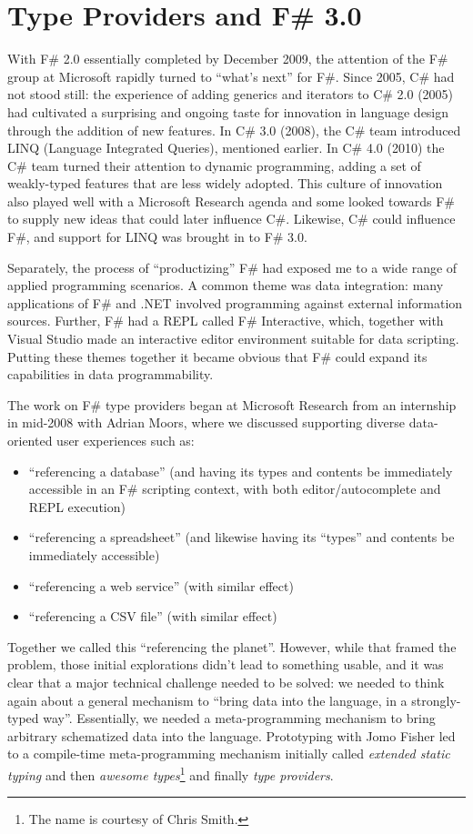 \documentclass[acmsmall]{acmart}\settopmatter{}
\begin{document}
\section*{Type Providers and F\# 3.0 }

With F\# 2.0 essentially completed by December 2009, the attention of the F\# group at Microsoft rapidly turned to “what’s next”
for F\#. Since 2005, C\# had not stood still: the experience of adding generics and iterators to C\# 2.0 (2005) had cultivated a
surprising and ongoing taste for innovation in language design through the addition of new features.  In C\# 3.0 (2008), the
C\# team introduced LINQ (Language Integrated Queries), mentioned earlier. In C\# 4.0 (2010) the C\# team turned their
attention to dynamic programming, adding a set of weakly-typed features that are less widely adopted. This culture of innovation
also played well with a Microsoft Research agenda and some looked towards F\# to supply new ideas that could later influence
C\#.  Likewise, C\# could influence F\#, and support for LINQ was brought in to F\# 3.0.

Separately, the process of “productizing” F\# had exposed me to a wide range of applied programming scenarios.  A common theme
was data integration: many applications of F\# and .NET involved programming against external information sources.  Further, F\# had
a REPL called F\# Interactive, which, together with Visual Studio made an interactive editor environment suitable for data scripting.
Putting these themes together it became obvious that F\# could expand its capabilities in data programmability.

The work on F\# type providers began at Microsoft Research from an internship in mid-2008 with Adrian Moors, where we discussed
supporting diverse data-oriented user experiences such as:

\begin{itemize}
\item “referencing a database” (and having its types and contents be immediately accessible in an F\# scripting context, with both editor/autocomplete and REPL execution)
\item “referencing a spreadsheet” (and likewise having its “types” and contents be immediately accessible)
\item “referencing a web service” (with similar effect)
\item “referencing a CSV file” (with similar effect)
\end{itemize}

Together we called this “referencing the planet”.  However, while that framed the problem, those initial explorations didn’t lead
to something usable, and it was clear that a major technical challenge needed to be solved: we needed to think again about a
general mechanism to “bring data into the language, in a strongly-typed way”.  Essentially, we needed a meta-programming
mechanism to bring arbitrary schematized data into the language. Prototyping with Jomo Fisher led to a compile-time meta-programming
mechanism initially called \textit{extended static typing} and then \textit{awesome types}\footnote{The name is courtesy of Chris Smith.} and finally \textit{type providers}. 
\end{document}
